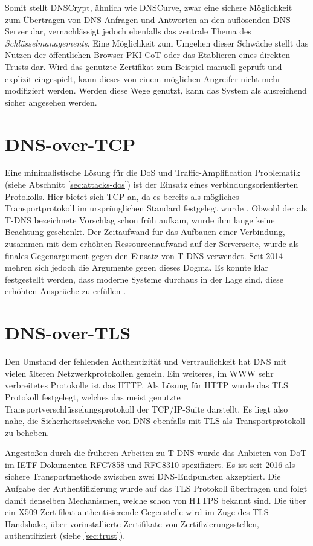 Somit stellt DNSCrypt, ähnlich wie DNSCurve, zwar eine sichere  Möglichkeit zum Übertragen von DNS-Anfragen und Antworten an den auflösenden DNS Server dar, vernachlässigt jedoch ebenfalls das zentrale Thema des \textit{Schlüsselmanagements}. Eine Möglichkeit zum Umgehen dieser Schwäche stellt das Nutzen der öffentlichen Browser-PKI CoT oder das Etablieren eines direkten Trusts dar. Wird das genutzte Zertifikat zum Beispiel manuell geprüft und explizit eingespielt, kann dieses von einem möglichen Angreifer nicht mehr modifiziert werden. Werden diese Wege genutzt, kann das System als ausreichend sicher angesehen werden.

\section{DNS-over-TCP}
Eine minimalistische Lösung für die DoS und Traffic-Amplification Problematik (siehe Abschnitt \ref{sec:attacks-dos}) ist der Einsatz eines verbindungsorientierten Protokolls. Hier bietet sich TCP an, da es bereits als mögliches Transportprotokoll im ursprünglichen Standard festgelegt wurde \cite{rfc1035}. Obwohl der als \ac{T-DNS} bezeichnete Vorschlag schon früh aufkam, wurde ihm lange keine Beachtung geschenkt. Der Zeitaufwand für das Aufbauen einer Verbindung, zusammen mit dem erhöhten Ressourcenaufwand auf der Serverseite, wurde als finales Gegenargument gegen den Einsatz von \ac{T-DNS} verwendet. Seit 2014 mehren sich jedoch die Argumente gegen dieses Dogma. Es konnte klar festgestellt werden, dass moderne Systeme durchaus in der Lage sind, diese erhöhten Ansprüche zu erfüllen \cite{Zhu2015}. 

\section{DNS-over-TLS}
\label{sec:tec-dot}
Den Umstand der fehlenden Authentizität und Vertraulichkeit hat DNS mit vielen älteren Netzwerkprotokollen gemein. Ein weiteres,  im \ac{WWW} sehr verbreitetes Protokolle ist das \ac{HTTP}. Als Lösung für HTTP wurde das \ac{TLS} Protokoll festgelegt, welches das meist genutzte Transportverschlüsselungsprotokoll der TCP/IP-Suite darstellt. Es liegt also nahe, die Sicherheitsschwäche von DNS ebenfalls mit TLS als Transportprotokoll zu beheben.

Angestoßen durch die früheren Arbeiten zu \ac{T-DNS} wurde das Anbieten von \ac{DoT} im IETF Dokumenten RFC7858 \cite{rfc7858} und RFC8310 \cite{Dickinson2018} spezifiziert. Es ist seit 2016 als sichere Transportmethode zwischen zwei DNS-Endpunkten akzeptiert. Die Aufgabe der Authentifizierung wurde auf das TLS Protokoll übertragen und folgt damit denselben Mechanismen, welche schon von HTTPS bekannt sind. Die über ein X509 Zertifikat authentisierende Gegenstelle wird im Zuge des TLS-Handshake, über vorinstallierte Zertifikate von Zertifizierungsstellen, authentifiziert (siehe \ref{sec:trust}).

